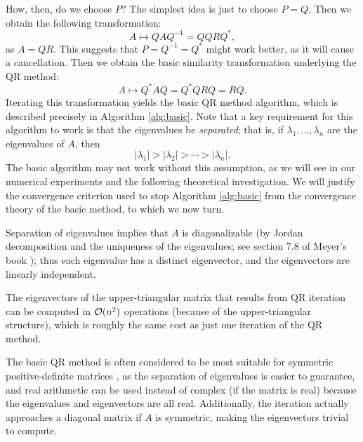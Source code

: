 \documentclass{article}
\begin{document}
How, then, do we choose $P$? The simplest idea is just to choose $P = Q$. Then we obtain the following transformation:
\begin{equation*}
	A \mapsto QAQ^{-1} = QQRQ^*,
\end{equation*}
as $A = QR$. This suggests that $P = Q^{-1} = Q^*$ might work better, as it will cause a cancellation. Then we obtain the basic similarity transformation underlying the QR method:
\begin{equation}
	A \mapsto Q^*AQ = Q^*QRQ = RQ.
\end{equation}
Iterating this transformation yields the basic QR method algorithm, which is described precisely in Algorithm \ref{alg:basic}. Note that a key requirement for this algorithm to work is that the eigenvalues be \textit{separated}; that is, if $\lambda_1, \dots, \lambda_n$ are the eigenvalues of $A$, then 
\begin{equation*}
	|\lambda_1| > |\lambda_2| >\cdots > |\lambda_n|.
\end{equation*}
The basic algorithm may not work without this assumption, as we will see in our numerical experiments and the following theoretical investigation. We will justify the convergence criterion used to stop {Algorithm \ref{alg:basic}} from the convergence theory of the basic method, to which we now turn. 
\begin{remark}
	Separation of eigenvalues implies that $A$ is diagonalizable (by Jordan decomposition and the uniqueness of the eigenvalues; see section 7.8 of Meyer's book \cite{meyer_2008}); thus each eigenvalue has a distinct eigenvector, and the eigenvectors are linearly independent.
\end{remark}
\begin{remark}
	The eigenvectors of the upper-triangular matrix that results from QR iteration can be computed in $\mathcal{O}(n^2)$ operations (because of the upper-triangular structure), which is roughly the same cost as just one iteration of the QR method.
\end{remark}
\begin{remark}
	The basic QR method is often considered to be most suitable for symmetric positive-definite matrices \cite{ackleh_2009}, as the separation of eigenvalues is easier to guarantee, and real arithmetic can be used instead of complex (if the matrix is real) because the eigenvalues and eigenvectors are all real. Additionally, the iteration actually approaches a diagonal matrix if $A$ is symmetric, making the eigenvectors trivial to compute.
\end{remark}
\end{document}
